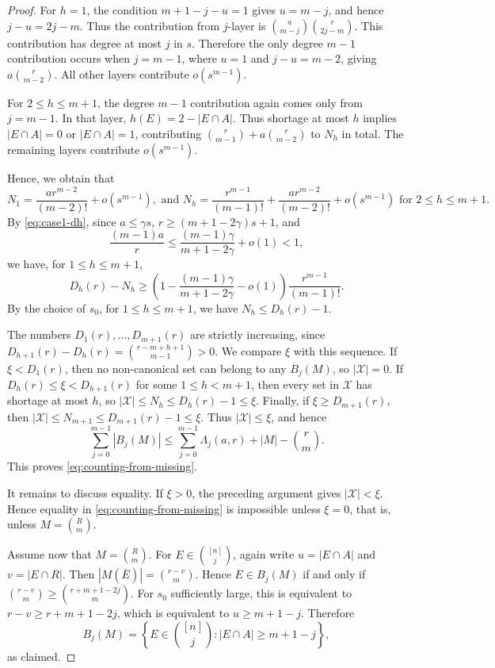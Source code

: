 \documentclass[10pt,a4paper]{amsart}
\begin{document}
\begin{proof}
    For \(h=1\), the condition \(m+1-j-u=1\) gives \(u=m-j\), and hence
    \(j-u=2j-m\).
    Thus the contribution from $j$-layer is $\binom a{m-j}\binom r{2j-m}$.
    This contribution has degree at most \(j\) in \(s\).
    Therefore the only degree \(m-1\) contribution occurs when \(j=m-1\), where \(u=1\) and \(j-u=m-2\), giving $a\binom r{m-2}$.
    All other layers contribute $o(s^{m-1})$.

    For \(2\le h\le m+1\), the degree \(m-1\) contribution again comes only from \(j=m-1\).
    In that layer, $h(E)=2-|E\cap A|$.
    Thus shortage at most \(h\) implies \(|E\cap A|=0\) or \(|E\cap A|=1\), contributing $\binom r{m-1}+a\binom r{m-2}$ to $N_h$ in total.
    The remaining layers contribute $o(s^{m-1})$.

    Hence, we obtain that
    \[
        N_1=\frac{a r^{m-2}}{(m-2)!}+o(s^{m-1}),
        \text{ and }
        N_h=
        \frac{r^{m-1}}{(m-1)!}
        +
        \frac{a r^{m-2}}{(m-2)!}
        +
        o(s^{m-1})
        \text{ for $2\le h\le m+1$.}
    \]
    By \eqref{eq:case1-dh}, since \(a\le\gamma s\), \(r\ge(m+1-2\gamma)s+1\), and
    \[
        \frac{(m-1)a}{r}
        \le
        \frac{(m-1)\gamma}{m+1-2\gamma}+o(1)
        <1,
    \]
    we have, for $1\le h\le m+1$,
    \[
        D_h(r)-N_h
        \ge
        \left(1-\frac{(m-1)\gamma}{m+1-2\gamma}-o(1)\right)
        \frac{r^{m-1}}{(m-1)!}.
    \]
    By the choice of \(s_0\), for $1\le h\le m+1$, we have
    \(N_h\le D_h(r)-1.\)

    The numbers \(D_1(r),\ldots,D_{m+1}(r)\) are strictly increasing, since
    \(D_{h+1}(r)-D_h(r)=\binom{r-m+h+1}{m-1}>0\).  We compare \(\xi\) with
    this sequence.
    If \(\xi<D_1(r)\), then no non-canonical set can belong to any \(B_j(M)\), so \(|\mathcal X|=0\).
    If \(D_h(r)\le\xi<D_{h+1}(r)\) for some \(1\le h<m+1\), then every set in \(\mathcal X\) has shortage at most \(h\), so
    \(|\mathcal X|\le N_h\le D_h(r)-1\le\xi.\)
    Finally, if \(\xi\ge D_{m+1}(r)\), then \(|\mathcal X|\le N_{m+1}\le D_{m+1}(r)-1\le\xi\).
    Thus \(|\mathcal X|\le\xi\), and hence
    \[
        \sum_{j=0}^{m-1}|B_j(M)|
        \le
        \sum_{j=0}^{m-1}\Lambda_j(a,r)+|M|-\binom rm.
    \]
    This proves \eqref{eq:counting-from-missing}.

    It remains to discuss equality.
    If \(\xi>0\), the preceding argument gives \(|\mathcal X|<\xi\).
    Hence equality in \eqref{eq:counting-from-missing} is impossible unless \(\xi=0\), that is, unless \(M=\binom Rm\).

    Assume now that \(M=\binom Rm\).
    For \(E\in\binom{[n]}j\), again write \(u=|E\cap A|\) and \(v=|E\cap R|\).
    Then \(|M(\overline E)|=\binom{r-v}{m}\).
    Hence \(E\in B_j(M)\) if and only if \(\binom{r-v}{m}\ge\binom{r+m+1-2j}{m}\).
    For \(s_0\) sufficiently large, this is equivalent to \(r-v\ge r+m+1-2j\), which is equivalent to \(u\ge m+1-j\).
    Therefore
    \[
        B_j(M)=
        \left\{
        E\in\binom{[n]}j: |E\cap A|\ge m+1-j
        \right\},
    \]
    as claimed.
\end{proof}
\end{document}

